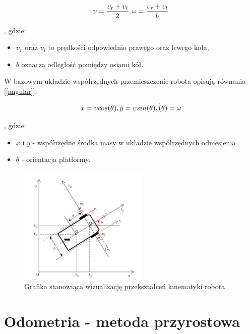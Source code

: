 \begin{equation}
    \centering
    \upsilon = \frac{\upsilon_r + \upsilon_l}{2},  \omega = \frac{\upsilon_r + \upsilon_l}{b}
    \label{eq:linear}
\end{equation}

, gdzie:
\begin{itemize}
    \item \(\upsilon_r\) oraz \(\upsilon_l\) to prędkości odpowiednio prawego oraz lewego koła,
    \item \(b\) oznacza odległość pomiędzy osiami kół.
\end{itemize}

W bazowym układzie współrzędnych przemieszczenie robota opisują równania [\ref{angular}]:

\begin{equation}
    \centering
    \dot{x} = \upsilon cos(\theta), \dot{y} = \upsilon sin(\theta), \dot(\theta) = \omega
    \label{eq:angular}
\end{equation}

, gdzie:
\begin{itemize}
    \item \(x\) i \(y\) - współrzędne środka masy w układzie współrzędnych odniesienia
    \item \(\theta\) - orientacja platformy.
\end{itemize}

\clearpage

\begin{figure}[H]
    \centering
    \includegraphics[width=0.55\textwidth]{./graf/diff-drive.png}
    \caption{Grafika stanowiąca wizualizację przekształceń kinematyki robota \cite{bib:konferencja}}
\end{figure}

\section{Odometria - metoda przyrostowa}

